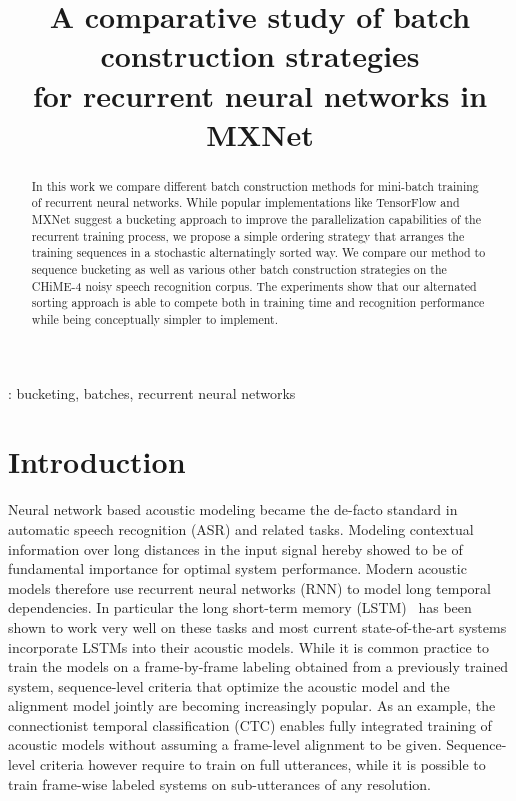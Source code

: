\documentclass{article}
\title{A comparative study of batch construction strategies \\
	 for recurrent neural networks in MXNet}
\begin{document}
  \maketitle
  \begin{abstract}
  	 In this work we compare different batch construction methods for mini-batch training
  	 of recurrent neural networks. While popular implementations like TensorFlow and MXNet suggest 
  	 a bucketing approach to improve the parallelization capabilities of the recurrent training process, 
  	 we propose a simple ordering strategy that arranges the training sequences in a stochastic alternatingly sorted way. We compare our method to sequence bucketing as well as various other
  	 batch construction strategies on the CHiME-4 noisy speech recognition corpus. The experiments
  	 show that our alternated sorting approach is able to compete both in training time and recognition performance while being conceptually simpler to implement. 
  \end{abstract}
  : bucketing, batches, recurrent neural networks

  \section{Introduction}
  	Neural network based acoustic modeling became the de-facto standard in automatic speech recognition (ASR)
  	and related tasks. Modeling contextual information over long distances in the input signal hereby showed to 
  	be of fundamental importance for optimal system performance. Modern acoustic models therefore use recurrent 
  	neural networks (RNN) to model long temporal dependencies. In particular the long short-term memory (LSTM)~\cite{hochreiter1997lstm}
  	has been shown to work very well on these tasks and most current state-of-the-art systems incorporate LSTMs
  	into their acoustic models. While it is common practice to train the
  	models on a frame-by-frame labeling obtained from a 
  	previously trained system, sequence-level criteria that optimize the acoustic model and the alignment model jointly
  	are becoming increasingly popular. As an example, the connectionist temporal classification (CTC) \cite{CTC}
  	enables fully integrated training of acoustic models without assuming a frame-level alignment to be given. Sequence-level
  	criteria however require to train on full utterances, while it is possible to train frame-wise labeled systems
  	on sub-utterances of any resolution.
  	
\end{document}
